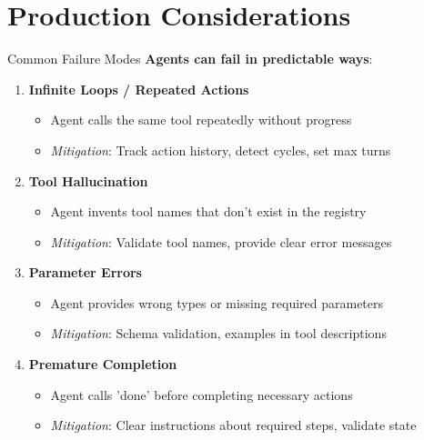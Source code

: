\documentclass[aspectratio=169]{beamer}
\begin{document}
\section{Production Considerations}

\begin{frame}{Common Failure Modes}
\textbf{Agents can fail in predictable ways}:
\vspace{0.3cm}

\begin{enumerate}
    \item \textbf{Infinite Loops / Repeated Actions}
    \begin{itemize}
        \item Agent calls the same tool repeatedly without progress
        \item \textit{Mitigation}: Track action history, detect cycles, set max turns
    \end{itemize}
    \vspace{0.15cm}

    \item \textbf{Tool Hallucination}
    \begin{itemize}
        \item Agent invents tool names that don't exist in the registry
        \item \textit{Mitigation}: Validate tool names, provide clear error messages
    \end{itemize}
    \vspace{0.15cm}

    \item \textbf{Parameter Errors}
    \begin{itemize}
        \item Agent provides wrong types or missing required parameters
        \item \textit{Mitigation}: Schema validation, examples in tool descriptions
    \end{itemize}
    \vspace{0.15cm}

    \item \textbf{Premature Completion}
    \begin{itemize}
        \item Agent calls 'done' before completing necessary actions
        \item \textit{Mitigation}: Clear instructions about required steps, validate state
    \end{itemize}
\end{enumerate}
\end{frame}
\end{document}
